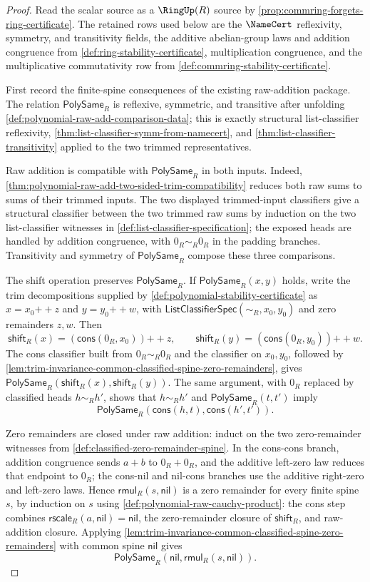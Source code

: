 \begin{proof}
Read the scalar source as a $\RingUp(R)$ source by \autoref{prop:commring-forgets-ring-certificate}. The retained rows used below are the $\NameCert$ reflexivity, symmetry, and transitivity fields, the additive abelian-group laws and addition congruence from \autoref{def:ring-stability-certificate}, multiplication congruence, and the multiplicative commutativity row from \autoref{def:commring-stability-certificate}.

First record the finite-spine consequences of the existing raw-addition package. The relation $\mathsf{PolySame}_R$ is reflexive, symmetric, and transitive after unfolding \autoref{def:polynomial-raw-add-comparison-data}; this is exactly structural list-classifier reflexivity, \autoref{thm:list-classifier-symm-from-namecert}, and \autoref{thm:list-classifier-transitivity} applied to the two trimmed representatives.

Raw addition is compatible with $\mathsf{PolySame}_R$ in both inputs. Indeed, \autoref{thm:polynomial-raw-add-two-sided-trim-compatibility} reduces both raw sums to sums of their trimmed inputs. The two displayed trimmed-input classifiers give a structural classifier between the two trimmed raw sums by induction on the two list-classifier witnesses in \autoref{def:list-classifier-specification}; the exposed heads are handled by addition congruence, with $0_R\sim_R0_R$ in the padding branches. Transitivity and symmetry of $\mathsf{PolySame}_R$ compose these three comparisons.

The shift operation preserves $\mathsf{PolySame}_R$. If $\mathsf{PolySame}_R(x,y)$ holds, write the trim decompositions supplied by \autoref{def:polynomial-stability-certificate} as $x=x_0{++}z$ and $y=y_0{++}w$, with $\mathsf{ListClassifierSpec}(\sim_R,x_0,y_0)$ and zero remainders $z,w$. Then
$$
\mathsf{shift}_R(x)=(\mathsf{cons}(0_R,x_0)){++}z,
\qquad
\mathsf{shift}_R(y)=(\mathsf{cons}(0_R,y_0)){++}w.
$$
The cons classifier built from $0_R\sim_R0_R$ and the classifier on $x_0,y_0$, followed by \autoref{lem:trim-invariance-common-classified-spine-zero-remainders}, gives $\mathsf{PolySame}_R(\mathsf{shift}_R(x),\mathsf{shift}_R(y))$. The same argument, with $0_R$ replaced by classified heads $h\sim_Rh'$, shows that $h\sim_Rh'$ and $\mathsf{PolySame}_R(t,t')$ imply
$$
\mathsf{PolySame}_R(\mathsf{cons}(h,t),\mathsf{cons}(h',t')).
$$

Zero remainders are closed under raw addition: induct on the two zero-remainder witnesses from \autoref{def:classified-zero-remainder-spine}. In the cons-cons branch, addition congruence sends $a+b$ to $0_R+0_R$, and the additive left-zero law reduces that endpoint to $0_R$; the cons-nil and nil-cons branches use the additive right-zero and left-zero laws. Hence $\mathsf{rmul}_R(s,\mathsf{nil})$ is a zero remainder for every finite spine $s$, by induction on $s$ using \autoref{def:polynomial-raw-cauchy-product}: the cons step combines $\mathsf{rscale}_R(a,\mathsf{nil})=\mathsf{nil}$, the zero-remainder closure of $\mathsf{shift}_R$, and raw-addition closure. Applying \autoref{lem:trim-invariance-common-classified-spine-zero-remainders} with common spine $\mathsf{nil}$ gives
$$
\mathsf{PolySame}_R(\mathsf{nil},\mathsf{rmul}_R(s,\mathsf{nil})).
$$


\end{proof}
